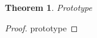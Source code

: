 \documentclass{ltjsarticle}
\newtheorem{theorem}{Theorem}
\begin{document}
\begin{theorem}
  Prototype
\end{theorem}
\begin{proof}
  prototype
\end{proof}
\end{document}
